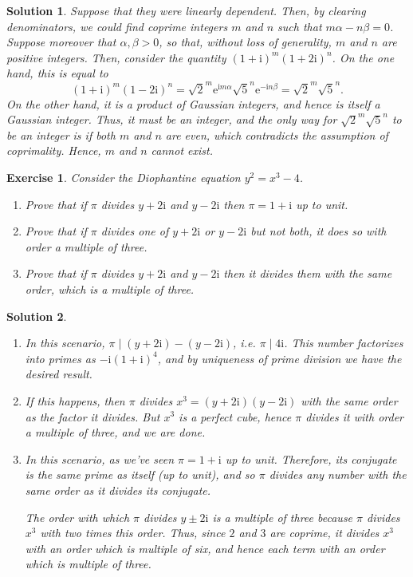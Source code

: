 \documentclass{article}
\newtheorem{ex}{Exercise}
\theoremstyle{nonumberplain}
\newtheorem{sol}{Solution}
\newcommand{\I}{\mathrm{i}}
\newcommand{\e}{\mathrm{e}}
\begin{document}
\begin{sol}
Suppose that they were linearly dependent. Then, by clearing denominators, we could find coprime integers $m$ and $n$ such that $m \alpha - n \beta = 0$. Suppose moreover that $\alpha, \beta > 0$, so that, without loss of generality, $m$ and $n$ are positive integers. Then, consider the quantity $(1+\I)^m (1+2\I)^n$. On the one hand, this is equal to
\begin{equation}
(1+\I)^m (1-2\I)^n = \sqrt2 ^m \e^{\I m \alpha}  \sqrt5^n \e^{-\I n \beta} = \sqrt2^m \sqrt5^n.
\end{equation}
On the other hand, it is a product of Gaussian integers, and hence is itself a Gaussian integer. Thus, it must be an integer, and the only way for $\sqrt2^m \sqrt5^n$ to be an integer is if both $m$ and $n$ are even, which contradicts the assumption of coprimality. Hence, $m$ and $n$ cannot exist.
\end{sol}

\begin{ex}
Consider the Diophantine equation $y^2 = x^3 - 4$.
\begin{enumerate}
\item Prove that if $\pi$ divides $y+2\I$ and $y-2\I$ then $\pi = 1+\I$ up to unit.
\item Prove that if $\pi$ divides one of $y + 2\I$ or $y - 2\I$ but not both, it does so with order a multiple of three.
\item Prove that if $\pi$ divides $y+2\I$ and $y-2\I$ then it divides them with the same order, which is a multiple of three.
\end{enumerate}
\end{ex}

\begin{sol}
\leavevmode
\begin{enumerate}
\item In this scenario, $\pi \mid (y+2\I) - (y-2\I)$, i.e. $\pi \mid 4\I$. This number factorizes into primes as $-\I (1+\I)^4$, and by uniqueness of prime division we have the desired result.
\item If this happens, then $\pi$ divides $x^3 = (y+2\I)(y-2\I)$ with the same order as the factor it divides. But $x^3$ is a perfect cube, hence $\pi$ divides it with order a multiple of three, and we are done.
\item In this scenario, as we've seen $\pi = 1+\I$ up to unit. Therefore, its conjugate is the same prime as itself (up to unit), and so $\pi$ divides any number with the same order as it divides its conjugate.

The order with which $\pi$ divides $y\pm2\I$ is a multiple of three because $\pi$ divides $x^3$ with two times this order. Thus, since $2$ and $3$ are coprime, it divides $x^3$ with an order which is multiple of six, and hence each term with an order which is multiple of three.
\end{enumerate}
\end{sol}
\end{document}
